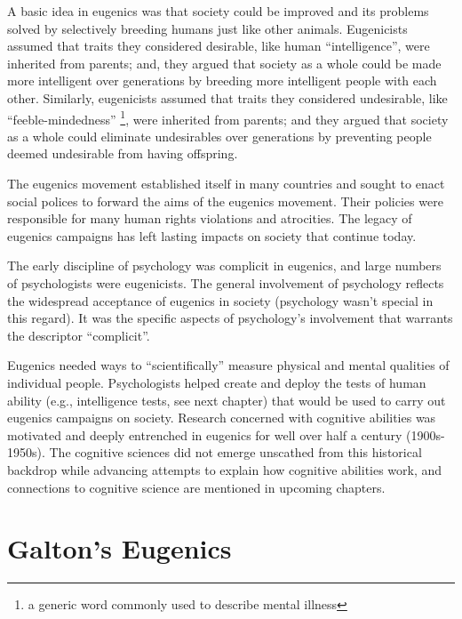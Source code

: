 \documentclass[
  oneside,
  12pt]{crumpbook}
\begin{document}
A basic idea in eugenics was that society could be improved and its problems solved by selectively breeding humans just like other animals. Eugenicists assumed that traits they considered desirable, like human ``intelligence'', were inherited from parents; and, they argued that society as a whole could be made more intelligent over generations by breeding more intelligent people with each other. Similarly, eugenicists assumed that traits they considered undesirable, like ``feeble-mindedness'' \footnote{a generic word commonly used to describe mental illness}, were inherited from parents; and they argued that society as a whole could eliminate undesirables over generations by preventing people deemed undesirable from having offspring.

The eugenics movement established itself in many countries and sought to enact social polices to forward the aims of the eugenics movement. Their policies were responsible for many human rights violations and atrocities. The legacy of eugenics campaigns has left lasting impacts on society that continue today.

The early discipline of psychology was complicit in eugenics, and large numbers of psychologists were eugenicists. The general involvement of psychology reflects the widespread acceptance of eugenics in society (psychology wasn't special in this regard). It was the specific aspects of psychology's involvement that warrants the descriptor ``complicit''.

Eugenics needed ways to ``scientifically'' measure physical and mental qualities of individual people. Psychologists helped create and deploy the tests of human ability (e.g., intelligence tests, see next chapter) that would be used to carry out eugenics campaigns on society. Research concerned with cognitive abilities was motivated and deeply entrenched in eugenics for well over half a century (1900s-1950s). The cognitive sciences did not emerge unscathed from this historical backdrop while advancing attempts to explain how cognitive abilities work, and connections to cognitive science are mentioned in upcoming chapters.

\hypertarget{galtons-eugenics}{%
\section{Galton's Eugenics}\label{galtons-eugenics}}
\end{document}
